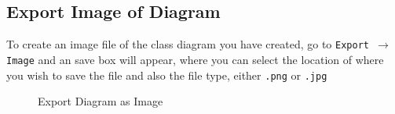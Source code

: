 \documentclass[a4paper]{article}
\begin{document}
\subsection{Export Image of Diagram}
To create an image file of the class diagram you have created, go to \texttt{Export $\rightarrow$ Image} and an save box will appear, where you can select the location of where you wish to save the file and also the file type, either \texttt{.png} or \texttt{.jpg}
\begin{figure}[H]
\begin{center}
	 \imagespace
\caption{Export Diagram as Image}
\end{center}
\end{figure}
\end{document}
